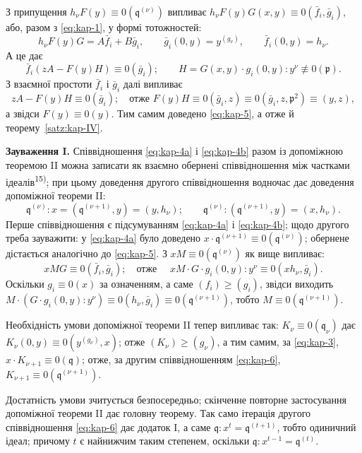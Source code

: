\documentclass[11pt]{article}
\theoremstyle{plain}
\begin{document}
З припущення $h_{\nu}F(y) \equiv 0(\mathfrak{q}^{(\nu)})$ випливає
$h_{\nu}F(y)G(x,y) \equiv 0(\bar{f}_{i}, \bar{g}_{i})$, або, разом з
\eqref{eq:kap-1}, у формі тотожностей:
\[
h_{\nu}F(y)G = A\bar{f}_{i} + B\bar{g}_{i}, \qquad
\bar{g}_{i}(0,y) = y^{(g_{\nu})}, \qquad
\bar{f}_{i}(0,y) = h_{\nu}.
\]
А це дає
\[
\bar{f}_{i}(zA - F(y)H) \equiv 0(\bar{g}_{i}); \qquad
H = G(x,y) \cdot g_{i}(0,y) : y^{\nu} \not\equiv 0(\mathfrak{p}).
\]
З взаємної простоти $\bar{f}_{i}$ і $\bar{g}_{i}$ далі випливає
\[
zA - F(y)H \equiv 0(\bar{g}_{i}); \quad \text{отже } F(y)H \equiv 0(\bar{g}_{i}, z)
\equiv 0(\bar{g}_{i}, z, \mathfrak{p}^{2}) \equiv (y, z),
\]
а звідси $F(y) \equiv 0(y)$. Тим самим доведено \eqref{eq:kap-5}, а
отже й теорему~\ref{satz:kap-IV}.

\smallskip
\textbf{Зауваження I.} Співвідношення \eqref{eq:kap-4a} і
\eqref{eq:kap-4b} разом із допоміжною теоремою II можна записати як
взаємно обернені співвідношення між частками ідеалів\textsuperscript{15)};
при цьому доведення другого співвідношення водночас дає доведення
допоміжної теореми II:
\begin{equation}\label{eq:kap-6}
\mathfrak{q}^{(\nu)} : x = (\mathfrak{q}^{(\nu+1)}, y) = (y, h_{\nu}); \qquad
\mathfrak{q}^{(\nu)} : (\mathfrak{q}^{(\nu+1)}, y) = (x, h_{\nu}).
\end{equation}
Перше співвідношення є підсумуванням \eqref{eq:kap-4a} і
\eqref{eq:kap-4b}; щодо другого треба зауважити: у
\eqref{eq:kap-4a} було доведено
$x \cdot \mathfrak{q}^{(\nu+1)} \equiv 0(\mathfrak{q}^{(\nu)})$;
обернене дістається аналогічно до \eqref{eq:kap-5}. З
$xM \equiv 0(\mathfrak{q}^{(\nu)})$ як вище випливає:
\[
xMG \equiv 0(\bar{f}_{i}, \bar{g}_{i}); \quad \text{отже }\quad
xM \cdot G \cdot g_{i}(0,y) : y^{\nu} \equiv 0(xh_{\nu}, \bar{g}_{i}).
\]
Оскільки $g_{i} \equiv 0(x)$ за означенням, а саме
$(f_{i}) \geq (g_{i})$, звідси виходить
$M \cdot (G \cdot g_{i}(0,y) : y^{\nu}) \equiv 0(h_{\nu}, \bar{g}_{i})
\equiv 0(\mathfrak{q}^{(\nu+1)})$, тобто
$M \equiv 0(\mathfrak{q}^{(\nu+1)})$.

Необхідність умови допоміжної теореми II тепер випливає так:
$K_{\nu} \equiv 0(\mathfrak{q}_{\nu})$ дає
$K_{\nu}(0,y) \equiv 0(y^{(g_{\nu})}, x)$; отже
$(K_{\nu}) \geq (g_{\nu})$, а тим самим, за \eqref{eq:kap-3},
$x \cdot K_{\nu+1} \equiv 0(\mathfrak{q})$; отже, за другим
співвідношенням \eqref{eq:kap-6},
$K_{\nu+1} \equiv 0(\mathfrak{q}^{(\nu+1)})$.

Достатність умови зчитується безпосередньо; скінченне повторне
застосування допоміжної теореми II дає головну теорему. Так само
ітерація другого співвідношення \eqref{eq:kap-6} дає додаток I, а
саме $\mathfrak{q} : x^{t} = \mathfrak{q}^{(t+1)}$, тобто одиничний
ідеал; причому $t$ є найнижчим таким степенем, оскільки
$\mathfrak{q} : x^{t-1} = \mathfrak{q}^{(t)}$.
\end{document}
